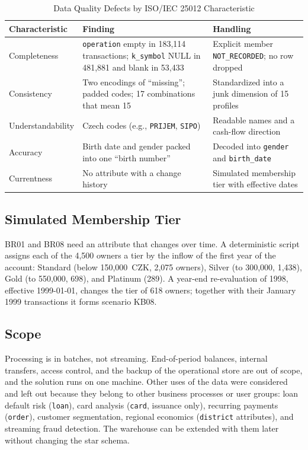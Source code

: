 \documentclass[peerreview]{IEEEtran}
\newcommand{\tbl}[1]{\texttt{#1}}
\begin{document}
\begin{table}[!t]
\centering
\caption{Data Quality Defects by ISO/IEC 25012 Characteristic}
\label{tab:dq}
\small
\begin{tabular}{L{2.3cm} L{7.0cm} L{5.4cm}}
\toprule
\textbf{Characteristic} & \textbf{Finding} & \textbf{Handling} \\
\midrule
Completeness & \tbl{operation} empty in 183,114 transactions; \tbl{k\_symbol} NULL in 481,881 and blank in 53,433 & Explicit member \texttt{NOT\_RECORDED}; no row dropped \\
Consistency & Two encodings of ``missing''; padded codes; 17 combinations that mean 15 & Standardized into a junk dimension of 15 profiles \\
Understand\-ability & Czech codes (e.g., \texttt{PRIJEM}, \texttt{SIPO}) & Readable names and a cash-flow direction \\
Accuracy & Birth date and gender packed into one ``birth number'' & Decoded into \tbl{gender} and \tbl{birth\_date} \\
Currentness & No attribute with a change history & Simulated membership tier with effective dates \\
\bottomrule
\end{tabular}
\end{table}

\subsection{Simulated Membership Tier}
\label{sec:tier}
BR01 and BR08 need an attribute that changes over time. A deterministic script assigns each of
the 4,500 owners a tier by the inflow of the first year of the account: Standard (below
150,000~CZK, 2,075 owners), Silver (to 300,000, 1,438), Gold (to 550,000, 698), and Platinum
(289). A year-end re-evaluation of 1998, effective 1999-01-01, changes the tier of 618 owners;
together with their January 1999 transactions it forms scenario KB08.

\subsection{Scope}
\label{sec:other-directions}
Processing is in batches, not streaming. End-of-period balances, internal transfers, access
control, and the backup of the operational store are out of scope, and the solution runs on
one machine. Other uses of the data were considered and left out because they belong to other
business processes or user groups: loan default risk (\tbl{loan}), card analysis
(\tbl{card}, issuance only), recurring payments (\tbl{order}), customer segmentation, regional
economics (\tbl{district} attributes), and streaming fraud detection. The warehouse can be
extended with them later without changing the star schema.
\end{document}
